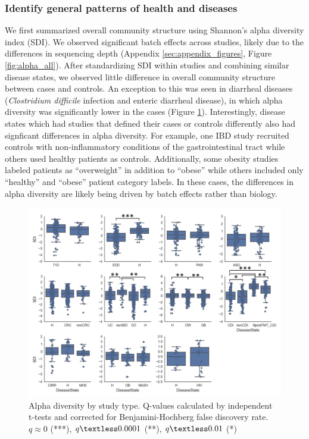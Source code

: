 \documentclass[12pt]{article}
\begin{document}
\subsubsection{Identify general patterns of health and diseases}
We first summarized overall community structure using Shannon's alpha diversity
index (SDI). We observed significant batch effects across studies, likely due to
the differences in sequencing depth (Appendix \ref{sec:appendix_figures}, Figure \ref{fig:alpha_all}). After standardizing SDI within studies
and combining similar disease states, we observed little difference in overall
community structure between cases and controls. An exception to this was seen
in diarrheal diseases (\textit{Clostridium difficile} infection and enteric 
diarrheal disease), in which alpha diversity was significantly lower in the cases (Figure \ref{fig:alpha}). Interestingly, disease states which had studies that defined
their cases or controls differently also had signficant differences
in alpha diversity. For example, one IBD study \cite{ibd-papa} recruited controls
with non-inflammatory conditions of the gastrointestinal tract while others \cite{ibd-gevers, ibd-engstrand, ibd_hut}
used healthy patients as controls. Additionally, some obesity studies \cite{ob-escobar, ob-goodrich, ob-gordon} labeled patients as ``overweight'' in addition
to ``obese'' while others \cite{ob-ross, ob-zupancic} included only ``healthy'' and ``obese'' patient 
category labels. In these cases, the differences in alpha diversity are 
likely being driven by batch effects rather than biology.

\begin{figure}
\begin{center}
	\includegraphics[scale=0.55]{alpha_diversity_by_study_type}
	\caption{Alpha diversity by study type. Q-values calculated by independent t-tests and corrected for Benjamini-Hochberg false discovery rate. $q \approx 0$ (***), $q \textless 0.0001$ (**), $q \textless 0.01$ (*)}	\label{fig:alpha}
\end{center}
\end{figure}
\end{document}
